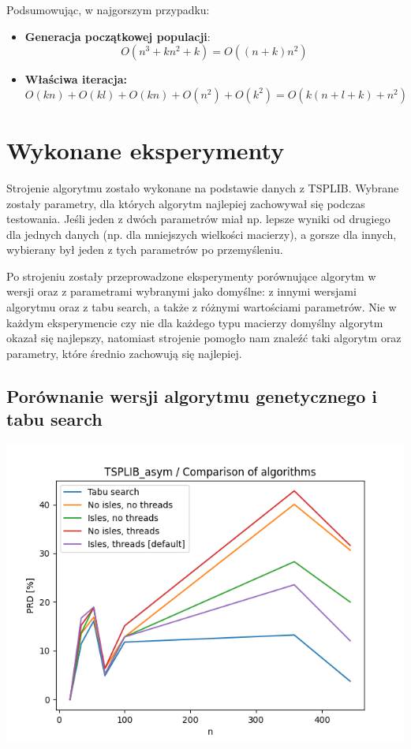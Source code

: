 \documentclass{article}
\begin{document}
Podsumowując, w najgorszym przypadku:
\begin{itemize}
\item \textbf{Generacja początkowej populacji}: $$O(n^3+kn^2+k)=O((n+k)n^2)$$
\item \textbf{Właściwa iteracja:}
$$O(kn)+O(kl)+O(kn)+O(n^2)+O(k^2)=O(k(n+l+k)+n^2)$$
\end{itemize}
\section{Wykonane eksperymenty}

Strojenie algorytmu zostało wykonane na podstawie danych z TSPLIB. Wybrane zostały parametry, dla których algorytm najlepiej zachowywał się podczas testowania. Jeśli jeden z dwóch parametrów miał np. lepsze wyniki od drugiego dla jednych danych (np. dla mniejszych wielkości macierzy), a gorsze dla innych, wybierany był jeden z tych parametrów po przemyśleniu.

Po strojeniu zostały przeprowadzone eksperymenty porównujące algorytm w wersji oraz z parametrami wybranymi jako domyślne: z innymi wersjami algorytmu oraz z tabu search, a także z różnymi wartościami parametrów. Nie w każdym eksperymencie czy nie dla każdego typu macierzy domyślny algorytm okazał się najlepszy, natomiast strojenie pomogło nam znaleźć taki algorytm oraz parametry, które średnio zachowują się najlepiej.

\subsection{Porównanie wersji algorytmu genetycznego i tabu search}

\begin{center}
\includegraphics[width=\textwidth, 
                   height = 0.4\textheight, 
                   keepaspectratio]
                  {plots/tsplib_asym_1_comparison} 
\end{center}
\end{document}
